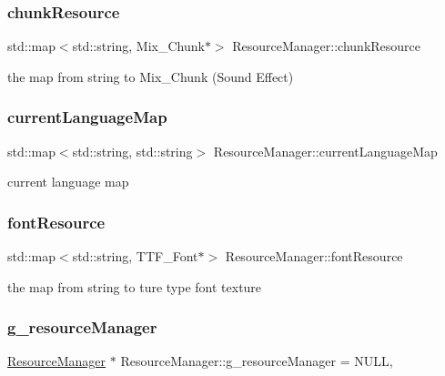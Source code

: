 \subsubsection{\texorpdfstring{chunk\+Resource}{chunkResource}}
{\footnotesize\ttfamily std\+::map$<$std\+::string, Mix\+\_\+\+Chunk$\ast$$>$ Resource\+Manager\+::chunk\+Resource\hspace{0.3cm}{\ttfamily [private]}}

the map from string to Mix\+\_\+\+Chunk (Sound Effect) \mbox{\label{class_resource_manager_a58ba6ab4799fe3d44082fc91960ed3c4}} 
\subsubsection{\texorpdfstring{current\+Language\+Map}{currentLanguageMap}}
{\footnotesize\ttfamily std\+::map$<$std\+::string, std\+::string$>$ Resource\+Manager\+::current\+Language\+Map\hspace{0.3cm}{\ttfamily [private]}}

current language map \mbox{\label{class_resource_manager_a63134aee6e58b1e7aa4e602a7ca53e44}} 
\subsubsection{\texorpdfstring{font\+Resource}{fontResource}}
{\footnotesize\ttfamily std\+::map$<$std\+::string, T\+T\+F\+\_\+\+Font$\ast$$>$ Resource\+Manager\+::font\+Resource\hspace{0.3cm}{\ttfamily [private]}}

the map from string to ture type font texture \mbox{\label{class_resource_manager_a0793631b5cdb7b23245a70227a33acbd}} 
\subsubsection{\texorpdfstring{g\+\_\+resource\+Manager}{g\_resourceManager}}
{\footnotesize\ttfamily \mbox{\hyperlink{class_resource_manager}{Resource\+Manager}} $\ast$ Resource\+Manager\+::g\+\_\+resource\+Manager = N\+U\+LL\hspace{0.3cm}{\ttfamily [static]}, {\ttfamily [private]}}

